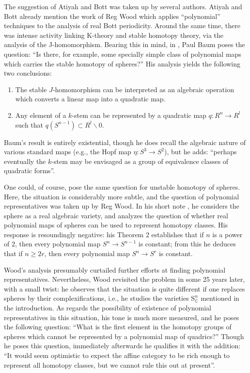 \documentclass[11pt,leqno]{article}
\newcommand{\cplx}{{\mathbb C}}
\renewcommand{\1}{{\rm 1\hspace*{-0.4ex}%
\rule{0.1ex}{1.52ex}\hspace*{0.2ex}}}
\newcommand{\<}[1]{{\langle}#1 {\rangle}}
\renewcommand{\setminus}{\smallsetminus}
\newcounter{intro}
\theoremstyle{plain}
\theoremstyle{definition}
\theoremstyle{remark}
\numberwithin{equation}{subsection}
\begin{document}
The suggestion of Atiyah and Bott was taken up by several authors.  Atiyah and Bott already mention the work of Reg Wood \cite{Wood1966BanachBott} which applies ``polynomial'' techniques to the analysis of real Bott periodicity.  Around the same time, there was intense activity linking K-theory and stable homotopy theory, via the analysis of the J-homomorphism.  Bearing this in mind, in \cite{Baum1967Quadratic}, Paul Baum poses the question: ``Is there, for example, some specially simple class of polynomial maps which carries the stable homotopy of spheres?''  His analysis yields the following two conclusions:
\begin{enumerate}[noitemsep,topsep=1pt]
	\item The stable $J$-homomorphism can be interpreted as an algebraic operation which converts a linear map into a quadratic map.
	\item Any element of a $k$-stem can be represented by a quadratic map $q: R^n \to R^l$ such that $q(S^{n-1}) \subset R^l \setminus 0$.
\end{enumerate}
Baum's result is entirely existential, though he does recall the algebraic nature of various standard maps (e.g., the Hopf map $\eta: S^3 \to S^2$), but he adds: ``perhaps eventually the $k$-stem may be envisaged as a group of equivalence classes of quadratic forms''.

One could, of course, pose the same question for unstable homotopy of spheres.  Here, the situation is considerably more subtle, and the question of polynomial representatives was taken up by Reg Wood.  In his short note \cite{Wood1968Polynomial}, he considers the sphere as a real algebraic variety, and analyzes the question of whether real polynomial maps of spheres can be used to represent homotopy classes.  His response is resoundingly negative: his Theorem 2 establishes that if $n$ is a power of $2$, then every polynomial map $S^n \to S^{n-1}$ is constant; from this he deduces that if $n \geq 2r$, then every polynomial map $S^n \to S^r$ is constant.  

Wood's analysis presumably curtailed further efforts at finding polynomial representatives.  Nevertheless, Wood revisited the problem in \cite{Wood1993Quadrics} some 25 years later, with a small twist: he observes that the situation is quite different if one replaces spheres by their complexifications, i.e., he studies the varieties $\mathrm{S}^n_{\cplx}$ mentioned in the introduction.  As regards the possibility of existence of polynomial representatives in this situation, his tone is much more measured, and he poses the following question: ``What is the first element in the homotopy groups of spheres which cannot be represented by a polynomial map of quadrics?''  Though he poses this question, immediately afterwards he qualifies it with the addition: ``It would seem optimistic to expect the affine category to be rich enough to represent all homotopy classes, but we cannot rule this out at present''.
\end{document}
